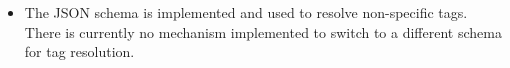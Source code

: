 
\begin{itemize}
\item The JSON schema is implemented and used to resolve non-specific tags.
  There is currently no mechanism implemented to switch to a different schema
  for tag resolution.
\end{itemize}
